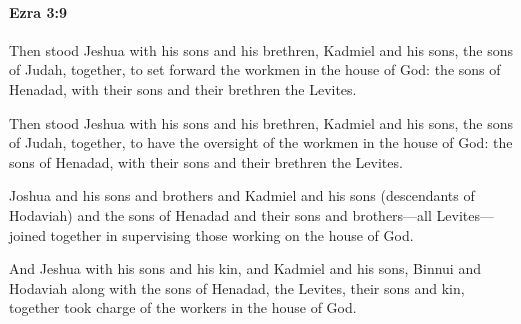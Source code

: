 		\paragraph{Ezra 3:9} %
			\label{EZRA-3-9}

			Then stood Jeshua with his sons and his brethren, Kadmiel and his sons, the sons of Judah, together, to set forward the workmen in the house of God: the sons of Henadad, with their sons and their brethren the Levites.

			\begin{versebox}
					\item[BHS] 
					\item[LXX] 
					\item[ASV] Then stood Jeshua with his sons and his brethren, Kadmiel and his sons, the sons of Judah, together, to have the oversight of the workmen in the house of God: the sons of Henadad, with their sons and their brethren the Levites.
					\item[NIV] Joshua and his sons and brothers and Kadmiel and his sons (descendants of Hodaviah) and the sons of Henadad and their sons and brothers—all Levites—joined together in supervising those working on the house of God.
					\item[NRSV] And Jeshua with his sons and his kin, and Kadmiel and his sons, Binnui and Hodaviah along with the sons of Henadad, the Levites, their sons and kin, together took charge of the workers in the house of God.
			\end{versebox}

